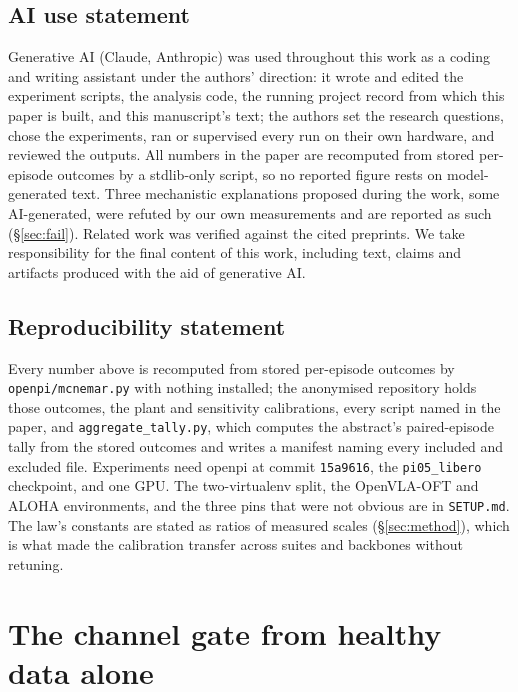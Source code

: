 \documentclass{article}
\newcommand{\code}[1]{\texttt{\small #1}}
\begin{document}
\label{main:lastpage}

\clearpage
{}\label{backmatter:firstpage}
\subsection*{AI use statement}
Generative AI (Claude, Anthropic) was used throughout this work as a coding and writing
assistant under the authors' direction: it wrote and edited the experiment scripts, the
analysis code, the running project record from which this paper is built, and this
manuscript's text; the authors set the research questions, chose the experiments, ran or
supervised every run on their own hardware, and reviewed the outputs. All numbers in the
paper are recomputed from stored per-episode outcomes by a stdlib-only script, so no
reported figure rests on model-generated text. Three mechanistic explanations proposed
during the work, some AI-generated, were refuted by our own measurements and are reported
as such (\S\ref{sec:fail}). Related work was verified against the cited preprints. We take
responsibility for the final content of this work, including text, claims and artifacts
produced with the aid of generative AI.

\subsection*{Reproducibility statement}
Every number above is recomputed from stored per-episode outcomes by \code{openpi/mcnemar.py}
with nothing installed; the anonymised repository holds those outcomes, the plant and
sensitivity calibrations, every script named in the paper, and \code{aggregate\_tally.py},
which computes the abstract's paired-episode tally from the stored outcomes and writes a
manifest naming every included and excluded file. Experiments need openpi at
commit \code{15a9616}, the \code{pi05\_libero} checkpoint, and one GPU. The two-virtualenv
split, the OpenVLA-OFT and ALOHA environments, and the three pins that were not obvious
are in \code{SETUP.md}. The law's constants are stated as ratios of measured scales
(\S\ref{sec:method}), which is what made the calibration transfer across suites and
backbones without retuning.




\appendix

\section{The channel gate from healthy data alone}
\label{app:gate}
\end{document}
